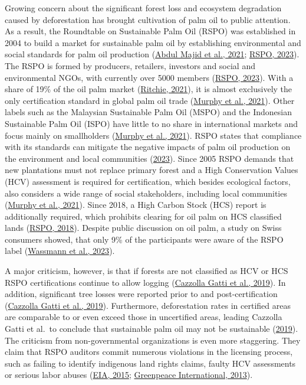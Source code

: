 \documentclass[
  letterpaper,
  DIV=11,
  numbers=noendperiod]{scrreprt}
\begin{document}
Growing concern about the significant forest loss and ecosystem
degradation caused by deforestation has brought cultivation of palm oil
to public attention. As a result, the Roundtable on Sustainable Palm Oil
(RSPO) was established in 2004 to build a market for sustainable palm
oil by establishing environmental and social standards for palm oil
production
(\protect\hyperlink{ref-abdulmajidSustainablePalmOil2021}{Abdul Majid et
al., 2021}; \protect\hyperlink{ref-rspoWhoWeAre2023}{RSPO, 2023}). The
RSPO is formed by producers, retailers, investors and social and
environmental NGOs, with currently over 5000 members
(\protect\hyperlink{ref-rspoWhoWeAre2023}{RSPO, 2023}). With a share of
19\% of the oil palm market
(\protect\hyperlink{ref-ritchiePalmOil2021}{Ritchie, 2021}), it is
almost exclusively the only certification standard in global palm oil
trade (\protect\hyperlink{ref-murphyOilPalm2020s2021}{Murphy et al.,
2021}). Other labels such as the Malaysian Sustainable Palm Oil (MSPO)
and the Indonesian Sustainable Palm Oil (ISPO) have little to no share
in international markets and focus mainly on smallholders
(\protect\hyperlink{ref-murphyOilPalm2020s2021}{Murphy et al., 2021}).
RSPO states that compliance with its standards can mitigate the negative
impacts of palm oil production on the environment and local communities
(\protect\hyperlink{ref-rspoWhoWeAre2023}{2023}). Since 2005 RSPO
demands that new plantations must not replace primary forest and a High
Conservation Values (HCV) assessment is required for certification,
which besides ecological factors, also considers a wide range of social
stakeholders, including local communities
(\protect\hyperlink{ref-murphyOilPalm2020s2021}{Murphy et al., 2021}).
Since 2018, a High Carbon Stock (HCS) report is additionally required,
which prohibits clearing for oil palm on HCS classified lands
(\protect\hyperlink{ref-rspoRSPOPrinciplesCriteria2018}{RSPO, 2018}).
Despite public discussion on oil palm, a study on Swiss consumers
showed, that only 9\% of the participants were aware of the RSPO label
(\protect\hyperlink{ref-wassmannPalmOilRoundtable2023}{Wassmann et al.,
2023}).

A major criticism, however, is that if forests are not classified as HCV
or HCS RSPO certifications continue to allow logging
(\protect\hyperlink{ref-cazzollagattiSustainablePalmOil2019}{Cazzolla
Gatti et al., 2019}). In addition, significant tree losses were reported
prior to and post-certification
(\protect\hyperlink{ref-cazzollagattiSustainablePalmOil2019}{Cazzolla
Gatti et al., 2019}). Furthermore, deforestation rates in certified
areas are comparable to or even exceed those in uncertified areas,
leading Cazzolla Gatti et al.~to conclude that sustainable palm oil may
not be sustainable
(\protect\hyperlink{ref-cazzollagattiSustainablePalmOil2019}{2019}). The
criticism from non-governmental organizations is even more staggering.
They claim that RSPO auditors commit numerous violations in the
licensing process, such as failing to identify indigenous land rights
claims, faulty HCV assessments or serious labor abuses
(\protect\hyperlink{ref-eiaWhoWatchesWatchmen2015}{EIA, 2015};
\protect\hyperlink{ref-greenpeaceinternationalCertifyingDestruction2013}{Greenpeace
International, 2013}).
\end{document}
